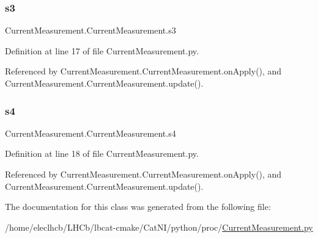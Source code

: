 \subsubsection{\texorpdfstring{s3}{s3}}
{\footnotesize\ttfamily Current\+Measurement.\+Current\+Measurement.\+s3}



Definition at line 17 of file Current\+Measurement.\+py.



Referenced by Current\+Measurement.\+Current\+Measurement.\+on\+Apply(), and Current\+Measurement.\+Current\+Measurement.\+update().

\mbox{\label{classCurrentMeasurement_1_1CurrentMeasurement_a809a02c49dce0fd059eadbd06740be0f}} 
\subsubsection{\texorpdfstring{s4}{s4}}
{\footnotesize\ttfamily Current\+Measurement.\+Current\+Measurement.\+s4}



Definition at line 18 of file Current\+Measurement.\+py.



Referenced by Current\+Measurement.\+Current\+Measurement.\+on\+Apply(), and Current\+Measurement.\+Current\+Measurement.\+update().



The documentation for this class was generated from the following file\+:\begin{DoxyCompactItemize}
\item 
/home/eleclhcb/\+L\+H\+Cb/lbcat-\/cmake/\+Cat\+N\+I/python/proc/\hyperlink{CurrentMeasurement_8py}{Current\+Measurement.\+py}\end{DoxyCompactItemize}
